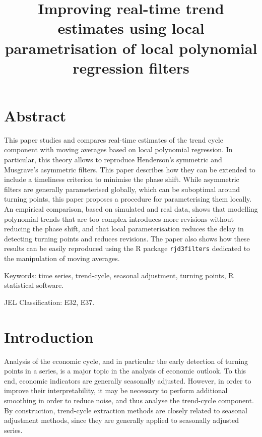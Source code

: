 \documentclass[
]{article}
\title{Improving real-time trend estimates using local parametrisation
of local polynomial regression filters}
\author{}
\date{}
\newcommand\1{\mathds{1}}
\begin{document}
\maketitle

\section*{Abstract}\label{abstract}

This paper studies and compares real-time estimates of the trend cycle
component with moving averages based on local polynomial regression. In
particular, this theory allows to reproduce Henderson's symmetric and
Musgrave's asymmetric filters. This paper describes how they can be
extended to include a timeliness criterion to minimise the phase shift.
While asymmetric filters are generally parameterised globally, which can
be suboptimal around turning points, this paper proposes a procedure for
parameterising them locally. An empirical comparison, based on simulated
and real data, shows that modelling polynomial trends that are too
complex introduces more revisions without reducing the phase shift, and
that local parameterisation reduces the delay in detecting turning
points and reduces revisions. The paper also shows how these results can
be easily reproduced using the R package \texttt{rjd3filters} dedicated
to the manipulation of moving averages.

Keywords: time series, trend-cycle, seasonal adjustment, turning points,
R statistical software.

JEL Classification: E32, E37.

\section{Introduction}\label{introduction}

Analysis of the economic cycle, and in particular the early detection of
turning points in a series, is a major topic in the analysis of economic
outlook. To this end, economic indicators are generally seasonally
adjusted. However, in order to improve their interpretability, it may be
necessary to perform additional smoothing in order to reduce noise, and
thus analyse the trend-cycle component. By construction, trend-cycle
extraction methods are closely related to seasonal adjustment methods,
since they are generally applied to seasonally adjusted series.
\end{document}
